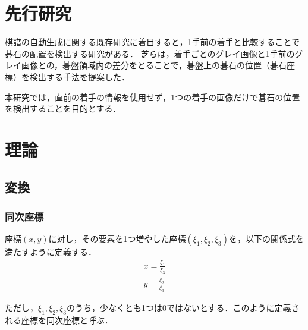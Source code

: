 \documentclass[openright]{nitocs}
\numberwithin{equation}{section}
\begin{document}
    \section{先行研究} %
        棋譜の自動生成に関する既存研究に着目すると，1手前の着手と比較することで碁石の配置を検出する研究がある．
        芝らは，着手ごとのグレイ画像と1手前のグレイ画像との，碁盤領域内の差分をとることで，碁盤上の碁石の位置（碁石座標）を検出する手法を提案した\cite{PilotStudy}．
        
        本研究では，直前の着手の情報を使用せず，1つの着手の画像だけで碁石の位置を検出することを目的とする．

    \section{理論} %
    \label{config}
        \subsection{変換}
            \subsubsection{同次座標}
                座標$(x,y)$に対し，その要素を1つ増やした座標$(\xi_1,\xi_2,\xi_3)$を，以下の関係式を満たすように定義する．\\
                \begin{equation} %
                    \begin{split} %
                        x = \frac{\xi_1}{\xi_3} \\ 
                        y = \frac{\xi_2}{\xi_3}
                    \end{split}
                    \label{Homogeneous}
                \end{equation}

                ただし，$\xi_1,\xi_2,\xi_3$のうち，少なくとも1つは0ではないとする．このように定義される座標を同次座標と呼ぶ\cite{Homogenous}．
\end{document}
